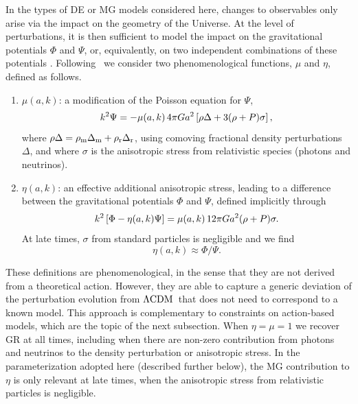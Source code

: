 \documentclass[longauth,traditabstract]{aa}
\def\,{\thinspace}
\providecommand{\LCDM}{{$\rm{\Lambda CDM}$}}
\newcommand{\PDEII}{\citetalias{planck2014-a16}} \newcommand{\rep}[1]{#1}
\begin{document}
In the types of DE or MG models considered here, changes to observables only arise via the impact on the geometry of the Universe.
At the level of perturbations,
it is then sufficient to model the impact on the gravitational potentials $\Phi$ and
$\Psi$, or, equivalently, on two independent
combinations of these potentials
\citep[e.g.,][]{Zhang:2007nk,Amendola:2007rr}.
Following \PDEII\ we consider two phenomenological functions, $\mu$ and $\eta$, defined as follows.
\begin{enumerate}
\item $\mu(a, k)$: a modification of the Poisson equation for $\Psi$,
\begin{equation} \label{eq:mudef}
 k^2\Psi=-\mu(a,k) \, 4\pi G a^2\left[\rho\Delta+3(\rho+P)\sigma\right],
\end{equation}
where $\rho\Delta = \rho_{\rm m} \Delta_{\rm m} + \rho_{\rm r} \Delta_{\rm r}$, using comoving fractional density perturbations $\Delta$, and where $\sigma$ is the anisotropic stress from relativistic species (photons and neutrinos).
\item $\eta(a,k)$: an effective additional anisotropic
stress, leading to a difference between the gravitational potentials $\Phi$ and $\Psi$, defined implicitly through
\begin{equation}\label{eq:neweta}
 k^2\left[\Phi-\eta(a,k)\Psi\right]=\mu(a,k) \, 12\pi G a^2(\rho+P)\sigma.
\end{equation}
At late times, $\sigma$ from standard particles is negligible and we find
\begin{equation} \label{eq:etadef}
 \eta(a,k) \approx \Phi/\Psi.
\end{equation}
\end{enumerate}

\vskip 0.1in

These definitions are phenomenological, in the sense that they are not
derived from a theoretical action. However, they are able to capture a
generic deviation of the perturbation evolution from \LCDM\ that does
not need to correspond to a known model.  This approach is
complementary to constraints on action-based models, which are the
topic of the next subsection.  When $\eta=\mu=1$ we recover GR at all
times, including when there are non-zero contribution from photons and
neutrinos to the density perturbation or anisotropic stress. In the
parameterization adopted here (described further below), the MG
contribution to $\eta$ is only relevant at late times, when the
anisotropic stress from relativistic particles is negligible.
\end{document}
